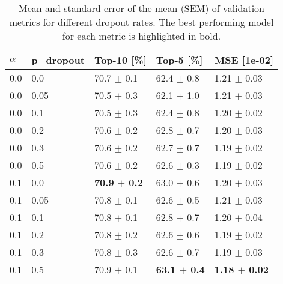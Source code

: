\begin{table}[h]
\caption{Mean and standard error of the mean (SEM) of validation metrics for different dropout rates. The best performing model for each metric is highlighted in bold.}
\label{tab:dropout}
\begin{tabular}{lllll}
\toprule
$\alpha$ & p_dropout & Top-10 [\%] & Top-5 [\%] & MSE [1e-02] \\
\midrule
0.0 & 0.0 & 70.7 $\pm$ 0.1 & 62.4 $\pm$ 0.8 & 1.21 $\pm$ 0.03 \\
0.0 & 0.05 & 70.5 $\pm$ 0.3 & 62.1 $\pm$ 1.0 & 1.21 $\pm$ 0.03 \\
0.0 & 0.1 & 70.5 $\pm$ 0.3 & 62.4 $\pm$ 0.8 & 1.20 $\pm$ 0.02 \\
0.0 & 0.2 & 70.6 $\pm$ 0.2 & 62.8 $\pm$ 0.7 & 1.20 $\pm$ 0.03 \\
0.0 & 0.3 & 70.6 $\pm$ 0.2 & 62.7 $\pm$ 0.7 & 1.19 $\pm$ 0.02 \\
0.0 & 0.5 & 70.6 $\pm$ 0.2 & 62.6 $\pm$ 0.3 & 1.19 $\pm$ 0.02 \\
0.1 & 0.0 & \textbf{70.9 $\pm$ 0.2} & 63.0 $\pm$ 0.6 & 1.20 $\pm$ 0.03 \\
0.1 & 0.05 & 70.8 $\pm$ 0.1 & 62.6 $\pm$ 0.5 & 1.21 $\pm$ 0.03 \\
0.1 & 0.1 & 70.8 $\pm$ 0.1 & 62.8 $\pm$ 0.7 & 1.20 $\pm$ 0.04 \\
0.1 & 0.2 & 70.8 $\pm$ 0.2 & 62.6 $\pm$ 0.6 & 1.19 $\pm$ 0.02 \\
0.1 & 0.3 & 70.8 $\pm$ 0.3 & 62.6 $\pm$ 0.7 & 1.19 $\pm$ 0.03 \\
0.1 & 0.5 & 70.9 $\pm$ 0.1 & \textbf{63.1 $\pm$ 0.4} & \textbf{1.18 $\pm$ 0.02} \\
\bottomrule
\end{tabular}
\end{table}
